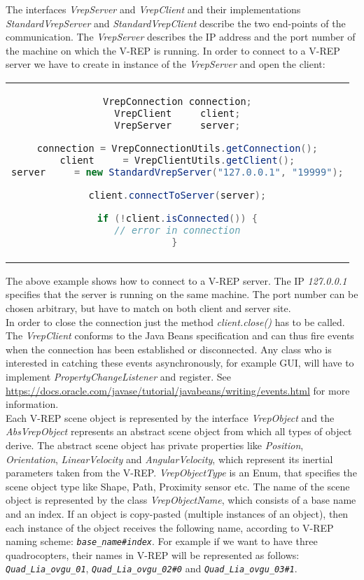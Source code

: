 The interfaces \textit{VrepServer} and \textit{VrepClient} and their implementations \textit{StandardVrepServer} and \textit{StandardVrepClient} describe the two end-points of the communication. The \textit{VrepServer} describes the IP address and the port number of the machine on which the V-REP is running. In order to connect to a V-REP server we have to create in instance of the \textit{VrepServer} and open the client:

\begin{center}
\begin{tabular}{c}
\begin{lstlisting}[basicstyle=\small, language=Java]
VrepConnection connection;
VrepClient     client;
VrepServer     server;

connection = VrepConnectionUtils.getConnection();
client     = VrepClientUtils.getClient();
server     = new StandardVrepServer("127.0.0.1", "19999");

client.connectToServer(server);

if (!client.isConnected()) {
// error in connection
} 
\end{lstlisting}
\end{tabular}
\end{center}

The above example shows how to connect to a V-REP server. The IP \textit{127.0.0.1} specifies that the server is running on the same machine. The port number can be chosen arbitrary, but have to match on both client and server site.\\
In order to close the connection just the method \textit{client.close()} has to be called. \\

The \textit{VrepClient} conforms to the Java Beans specification and can thus fire events when the connection has been established or disconnected. Any class who is interested in catching these events asynchronously, for example GUI, will have to implement \textit{PropertyChangeListener} and register. See
\url{https://docs.oracle.com/javase/tutorial/javabeans/writing/events.html} for more information. \\

Each V-REP scene object is represented by the interface \textit{VrepObject} and the \textit{AbsVrepObject} represents an abstract scene object from which all types of object derive. The abstract scene object has private properties like \textit{Position}, \textit{Orientation}, \textit{LinearVelocity} and \textit{AngularVelocity}, which represent its inertial parameters taken from the V-REP.
\textit{VrepObjectType} is an Enum, that specifies the scene object type like Shape, Path, Proximity sensor etc. The name of the scene object is represented by the class \textit{VrepObjectName}, which consists of a base name and an index. If an object is copy-pasted (multiple instances of an object), then
each instance of the object receives the following name, according to V-REP naming scheme: \textit{\texttt{base\_name\#index}}. For example if we want to have three quadrocopters, their names in V-REP will be represented as follows: \textit{\texttt{Quad\_Lia\_ovgu\_01}}, \textit{\texttt{Quad\_Lia\_ovgu\_02\#0}} and \textit{\texttt{Quad\_Lia\_ovgu\_03\#1}}. \\

